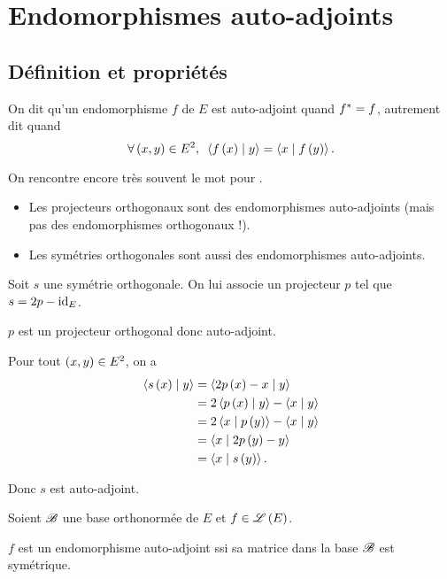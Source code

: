 \section{Endomorphismes auto-adjoints}

\subsection{Définition et propriétés}

\begin{defi}
On dit qu'un endomorphisme \(f\) de \(E\) est auto-adjoint quand \(f^*=f\), autrement dit quand \[\quantifs{\forall\paren{x,y}\in E^2}\ps{f\paren{x}}{y}=\ps{x}{f\paren{y}}.\]
\end{defi}

On rencontre encore très souvent le mot  pour .

\begin{ex}
\begin{itemize}
    \item Les projecteurs orthogonaux sont des endomorphismes auto-adjoints (mais pas des endomorphismes orthogonaux !). \\
    \item Les symétries orthogonales sont aussi des endomorphismes auto-adjoints.
\end{itemize}
\end{ex}

\begin{dem}
Soit \(s\) une symétrie orthogonale. On lui associe un projecteur \(p\) tel que \(s=2p-\mathrm{id}_{E}\).

\(p\) est un projecteur orthogonal donc auto-adjoint.

Pour tout \(\left(x,y\right)\in E^2\), on a \[\begin{aligned}
\ps{s\paren{x}}{y}&=\ps{2p\paren{x}-x}{y} \\
&=2\ps{p\paren{x}}{y}-\ps{x}{y} \\
&=2\ps{x}{p\paren{y}}-\ps{x}{y} \\
&=\ps{x}{2p\paren{y}-y} \\
&=\ps{x}{s\paren{y}}.
\end{aligned}\]

Donc \(s\) est auto-adjoint.
\end{dem}

\begin{prop}
Soient \(\mathscr{B}\) une base orthonormée de \(E\) et \(f\in\mathscr{L}\left(E\right)\).

\(f\) est un endomorphisme auto-adjoint ssi sa matrice dans la base \(\mathscr{B}\) est symétrique.
\end{prop}

